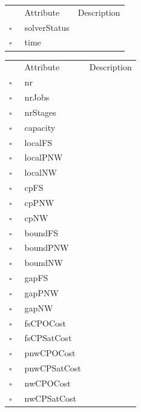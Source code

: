 \begin{table}
\caption{SolverRun  }

\begin{longtable}{llp{8cm}}
& Attribute & Description \\
$\square$\ & solverStatus &  \\
$\square$\ & time &  \\
\end{longtable}
\label{attr:SolverRun}
\end{table}

\begin{table}
\caption{Summary  }

\begin{longtable}{llp{8cm}}
& Attribute & Description \\
$\square$\ & nr &  \\
$\square$\ & nrJobs &  \\
$\square$\ & nrStages &  \\
$\square$\ & capacity &  \\
$\square$\ & localFS &  \\
$\square$\ & localPNW &  \\
$\square$\ & localNW &  \\
$\square$\ & cpFS &  \\
$\square$\ & cpPNW &  \\
$\square$\ & cpNW &  \\
$\square$\ & boundFS &  \\
$\square$\ & boundPNW &  \\
$\square$\ & boundNW &  \\
$\square$\ & gapFS &  \\
$\square$\ & gapPNW &  \\
$\square$\ & gapNW &  \\
$\square$\ & fsCPOCost &  \\
$\square$\ & fsCPSatCost &  \\
$\square$\ & pnwCPOCost &  \\
$\square$\ & pnwCPSatCost &  \\
$\square$\ & nwCPOCost &  \\
$\square$\ & nwCPSatCost &  \\
\end{longtable}
\label{attr:Summary}
\end{table}

